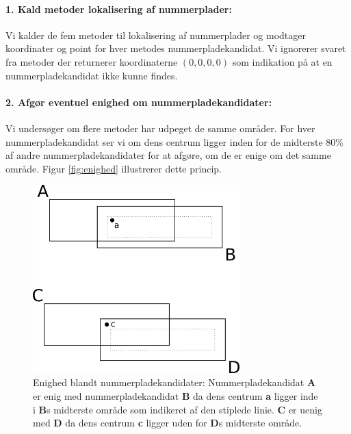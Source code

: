 \paragraph{1. Kald metoder lokalisering af nummerplader:}
Vi kalder de fem metoder til lokalisering af nummerplader og modtager koordinater og point for hver metodes nummerpladekandidat. Vi ignorerer svaret fra metoder der returnerer koordinaterne $(0,0,0,0)$ som indikation på at en nummerpladekandidat ikke kunne findes.

\paragraph{2. Afgør eventuel enighed om nummerpladekandidater:}
Vi undersøger om flere metoder har udpeget de samme områder. For hver nummerpladekandidat ser vi om dens centrum ligger inden for de midterste 80\% af andre nummerpladekandidater for at afgøre, om de er enige om det samme område. Figur \vref{fig:enighed} illustrerer dette princip.

\begin{figure}[htp]
\centering
\includegraphics[width=8cm]{implementation/illu/illu_enighed.png}
\caption{Enighed blandt nummerpladekandidater: Nummerpladekandidat \textbf{A} er enig med nummerpladekandidat \textbf{B} da dens centrum \textbf{a} ligger inde i \textbf{B}s midterste område som indikeret af den stiplede linie. \textbf{C} er uenig med \textbf{D} da dens centrum \textbf{c} ligger uden for \textbf{D}s midterste område.}
\label{fig:enighed}
\end{figure}

